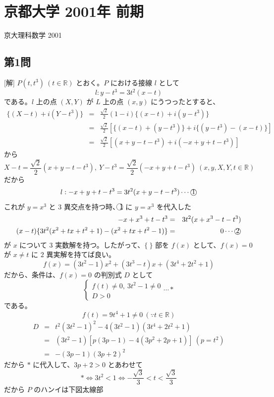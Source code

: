 \documentclass[../main.tex]{subfiles}
\begin{document}
\section*{京都大学 2001年 前期}
\begin{center}
  京大理科数学 2001
\end{center}

\subsection*{第1問}
[解] $P(t, t^3)\ (t \in \mathbb{R})$ とおく。$P$ における接線 $l$ として
\[ l: y - t^3 = 3t^2(x - t) \]
である。$l$ 上の点 $(X,Y)$ が $L$ 上の点 $(x,y)$ にうつったとすると、
\begin{eqnarray*}
  \{ (X-t) + i(Y-t^3) \} &=& \frac{\sqrt{2}}{2}(1-i) \{ (x-t) + i(y-t^3) \} \\
  &=& \frac{\sqrt{2}}{2} \left[ \{ (x-t) + (y-t^3) \} + i \{ (y-t^3) - (x-t) \} \right] \\
  &=& \frac{\sqrt{2}}{2} \left[ (x+y-t-t^3) + i (-x+y+t-t^3) \right]
\end{eqnarray*}
から
\[ X-t = \frac{\sqrt{2}}{2}(x+y-t-t^3),\ Y-t^3 = \frac{\sqrt{2}}{2}(-x+y+t-t^3)\ (x, y, X, Y, t \in \mathbb{R}) \]
だから
\[ l: -x+y+t-t^3 = 3t^2 (x+y-t-t^3) \cdots \text{\textcircled{1}} \]
これが $y=x^3$ と $3$ 異交点を持つ時、\textcircled{1} に $y=x^3$ を代入した
\begin{eqnarray*}
  -x+x^3+t-t^3 &=& 3t^2 (x+x^3-t-t^3) \\
  (x-t) \{ 3t^2 (x^2+tx+t^2+1) - (x^2+tx+t^2-1) \} &=& 0 \cdots \text{\textcircled{2}}
\end{eqnarray*}
が $x$ について $3$ 実数解を持つ。したがって、$\{ \ \}$ 部を $f(x)$ として、$f(x)=0$ が $x \neq t$ に $2$ 異実解を持てば良い。
\[ f(x) = (3t^2-1)x^2 + (3t^3-t)x + (3t^4+2t^2+1) \]
だから、条件は、$f(x)=0$ の判別式 $D$ として
\[
  \begin{cases} f(t) \neq 0,\ 3t^2-1 \neq 0 \\ D > 0
\end{cases} \cdots * \]
である。
\[ f(t) = 9t^4+1 \neq 0 \ (\because t \in \mathbb{R}) \]
\begin{eqnarray*}
  D &=& t^2(3t^2-1)^2 - 4(3t^2-1)(3t^4+2t^2+1) \\
  &=& (3t^2-1) \left[ p(3p-1) - 4(3p^2+2p+1) \right] \ (p=t^2) \\
  &=& -(3p-1)(3p+2)^2
\end{eqnarray*}
だから $*$ に代入して、$3p+2>0$ とあわせて
\[ * \iff 3t^2 < 1 \iff -\frac{\sqrt{3}}{3} < t < \frac{\sqrt{3}}{3} \]
だから $P$ のハンイは下図太線部
\end{document}
